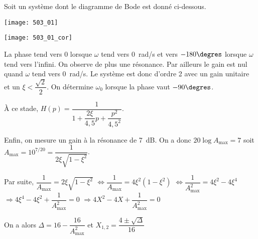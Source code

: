 \normaltrue \difficilefalse \tdifficilefalse
\correctiontrue


\setcounter{question}{0}%

\ifcorrection
\else
{}
\fi


\ifprof 
\else


Soit un système dont le diagramme de Bode est donné ci-dessous.
\begin{marginfigure}
\texttt{[image: 503\_01]}
\end{marginfigure}
\fi

\ifprof
\begin{marginfigure}
\texttt{[image: 503\_01\_cor]}
\end{marginfigure}
\else
\fi


\ifprof
La phase tend vers 0 lorsque $\omega$ tend vers \SI{0}{rad/s} et vers $-180\degres$ lorsque $\omega$ tend vers l'infini. 
On observe de plus une résonance. Par ailleurs le gain est nul quand $\omega$ tend vers \SI{0}{rad/s}. 
Le système est donc d'ordre 2 avec un gain unitaire et un $\xi<\dfrac{\sqrt{2}}{2}$. 
On détermine $\omega_0$ lorsque la phase vaut $-90\degres$.

À ce stade, $H(p)=\dfrac{1}{1+\dfrac{2\xi}{4,5}p+\dfrac{p^2}{4,5^2}}$.

Enfin, on mesure un gain à la résonance de \SI{7}{dB}. 
On a donc $20\log A_{\text{max}}=7$ soit $A_{\text{max}}=10^{7/20}= \dfrac{1}{2\xi\sqrt{1-\xi^2}}$.

Par suite, 
 $\dfrac{1}{A_{\text{max}}}=2\xi\sqrt{1-\xi^2}$
 $\Leftrightarrow \dfrac{1}{A_{\text{max}}}=4\xi^2\left(1-\xi^2\right)$
 $\Leftrightarrow \dfrac{1}{A^2_{\text{max}}}=4\xi^2-4\xi^4$
  $\Rightarrow 4\xi^4 -4\xi^2+ \dfrac{1}{A^2_{\text{max}}}=0$ 
  $\Rightarrow 4X^2 -4X+ \dfrac{1}{A^2_{\text{max}}}=0$
  
 On a alors $\Delta = 16 -  \dfrac{16}{A^2_{\text{max}}}$ et $X_{1,2} = \dfrac{4\pm\sqrt{\Delta}}{16}$
 
